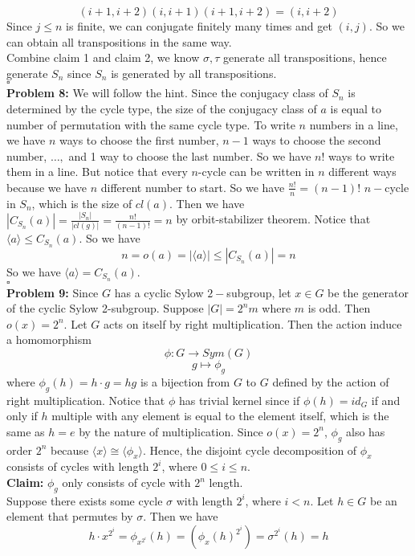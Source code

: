 \documentclass[12pt]{amsart}
\begin{document}
\[(i+1,i+2)(i,i+1)(i+1,i+2)=(i,i+2)\]
Since $j\leq n$ is finite, we can conjugate finitely many times and get $(i,j)$. So we can obtain all transpositions in the same way.\\
Combine claim 1 and claim 2, we know $\sigma,\tau$ generate all transpositions, hence generate $S_n$ since $S_n$ is generated by all transpositions.
\\\phantom{qed}\hfill$\square$\\
\textbf{Problem 8:} We will follow the hint. Since the conjugacy class of $S_n$ is determined by the cycle type, the size of the conjugacy class of $a$ is equal to number of permutation with the same cycle type. To write $n$ numbers in a line, we have $n$ ways to choose the first number, $n-1$ ways to choose the second number, $\dots,$ and 1 way to choose the last number. So we have $n!$ ways to write them in a line. But notice that every $n$-cycle can be written in $n$ different ways because we have $n$ different number to start. So we have $\frac{n!}{n}=(n-1)!$ $n-$cycle in $S_n$, which is the size of $cl(a)$. Then we have $|C_{S_n}(a)|=\frac{|S_n|}{|cl(g)|}=\frac{n!}{(n-1)!}=n$ by orbit-stabilizer theorem. Notice that $\langle a\rangle \leq C_{S_n}(a)$. So we have 
$$n=o(a)=|\langle a\rangle|\leq |C_{S_n}(a)|=n $$
So we have $\langle a \rangle =C_{S_n}(a)$.
\\\phantom{qed}\hfill$\square$\\
\textbf{Problem 9:} Since $G$ has a cyclic Sylow $2-$subgroup, let $x\in G$ be the generator of the cyclic Sylow 2-subgroup. Suppose $|G|=2^nm$ where $m$ is odd. Then $o(x)=2^n$. Let $G$ acts on itself by right multiplication. Then the action induce a homomorphism 
\[\phi:G\to Sym(G)\]
\[g\mapsto \phi_g\]
where $\phi_g(h)=h\cdot g=hg$ is a bijection from $G$ to $G$ defined by the action of right multiplication. Notice that $\phi$ has trivial kernel since if $\phi(h)=id_G$ if and only if $h$ multiple with any element is equal to the element itself, which is the same as $h=e$ by the nature of multiplication. Since $o(x)=2^n$, $\phi_g$ also has order $2^n$ because $\langle x\rangle \cong \langle \phi_x\rangle.$ Hence, the disjoint cycle decomposition of $\phi_x$ consists of cycles with length $2^i$, where $0\leq i\leq n$.\\
\textbf{Claim:} $\phi_g$ only consists of cycle with $2^n$ length.\\
Suppose there exists some cycle $\sigma$ with length $2^i$, where $i<n$. Let $h\in G$ be an element that permutes by $\sigma$. Then we have 
\[h\cdot x^{2^i}=\phi_{x^{2^i}}(h)=(\phi_x(h)^{2^i})=\sigma^{2^i}(h)=h\]
\end{document}
